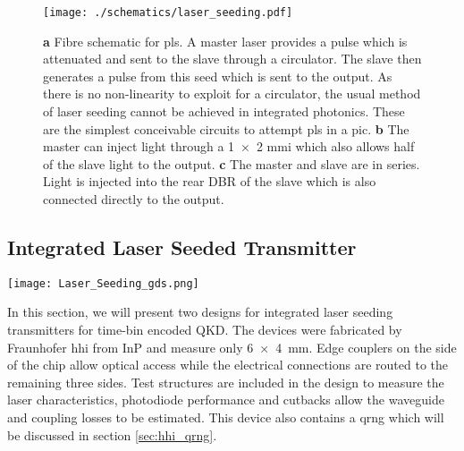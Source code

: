 \begin{figure}[t]
	\centering
	\texttt{[image: ./schematics/laser\_seeding.pdf]}
	\caption[Schematic of fibre-based and on-chip PLS]{\textbf{a} Fibre schematic for \acf{pls}. A master laser provides a pulse which is attenuated and sent to the slave through a circulator. The slave then generates a pulse from this seed which is sent to the output. As there is no non-linearity to exploit for a circulator, the usual method of laser seeding cannot be achieved in integrated photonics. These are the simplest conceivable circuits to attempt \acs{pls} in a \acs{pic}. \textbf{b} The master can inject light through a \num{1x2} \acs{mmi} which also allows half of the slave light to the output. \textbf{c} The master and slave are in series. Light is injected into the rear \acs{DBR} of the slave which is also connected directly to the output.}
	\label{fig:las_seed_schem}
\end{figure}

\subsection{Integrated Laser Seeded Transmitter}

\begin{sidewaysfigure}
	\centering
	\texttt{[image: Laser\_Seeding\_gds.png]}
	\caption[InP laser seeding transmitter with \acs{qrng}]{This shows the layout of the laser seeded transmitter device fabricated by \acs{hhi}. The optical components are shown in blue while the electrical connections are in red. The chip measures \SI{6x4}{mm} and contains two laser seeding prototype circuits, a homodyne \acs{qrng} and test structure to measure laser and waveguide performances. Wires are routed to the side of the chip to allow wirebonding. Light is converted from the waveguide mode to a \SI{10}{\um} mode with \acsp{ssc} at the side of the chip.}
	\label{fig:hhi_laser_seeding}
\end{sidewaysfigure}

In this section, we will present two designs for integrated laser seeding transmitters for time-bin encoded \ac{QKD}. The devices were fabricated by Fraunhofer \ac{hhi} from \ac{InP} and measure only \SI{6x4}{mm}. Edge couplers on the side of the chip allow optical access while the electrical connections are routed to the remaining three sides. Test structures are included in the design to measure the laser characteristics, photodiode performance and cutbacks allow the waveguide and coupling losses to be estimated. This device also contains a \ac{qrng} which will be discussed in section \ref{sec:hhi_qrng}.

